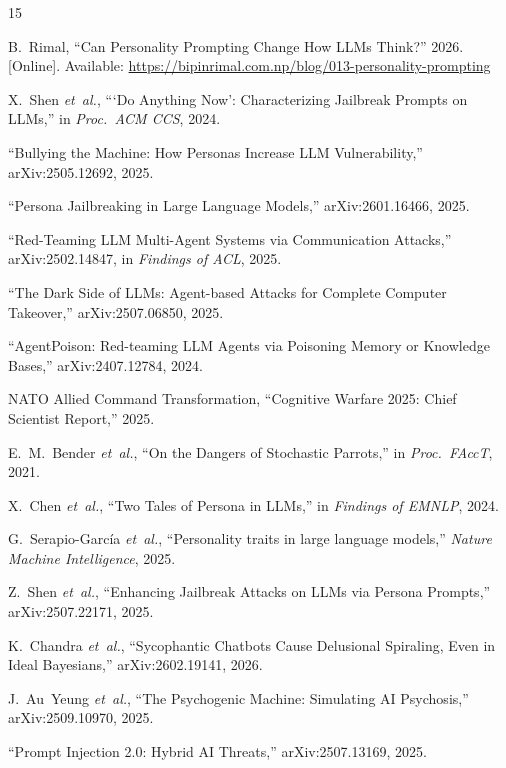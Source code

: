\documentclass[conference]{IEEEtran}
\begin{document}
\begin{thebibliography}{15}

B.~Rimal, ``Can Personality Prompting Change How LLMs Think?'' 2026. [Online]. Available: \url{https://bipinrimal.com.np/blog/013-personality-prompting}

X.~Shen \textit{et~al.}, ```Do Anything Now': Characterizing Jailbreak Prompts on LLMs,'' in \textit{Proc.\ ACM CCS}, 2024.

``Bullying the Machine: How Personas Increase LLM Vulnerability,'' arXiv:2505.12692, 2025.

``Persona Jailbreaking in Large Language Models,'' arXiv:2601.16466, 2025.

``Red-Teaming LLM Multi-Agent Systems via Communication Attacks,'' arXiv:2502.14847, in \textit{Findings of ACL}, 2025.

``The Dark Side of LLMs: Agent-based Attacks for Complete Computer Takeover,'' arXiv:2507.06850, 2025.

``AgentPoison: Red-teaming LLM Agents via Poisoning Memory or Knowledge Bases,'' arXiv:2407.12784, 2024.

NATO Allied Command Transformation, ``Cognitive Warfare 2025: Chief Scientist Report,'' 2025.

E.~M.~Bender \textit{et~al.}, ``On the Dangers of Stochastic Parrots,'' in \textit{Proc.\ FAccT}, 2021.

X.~Chen \textit{et~al.}, ``Two Tales of Persona in LLMs,'' in \textit{Findings of EMNLP}, 2024.

G.~Serapio-Garc\'{i}a \textit{et~al.}, ``Personality traits in large language models,'' \textit{Nature Machine Intelligence}, 2025.

Z.~Shen \textit{et~al.}, ``Enhancing Jailbreak Attacks on LLMs via Persona Prompts,'' arXiv:2507.22171, 2025.

K.~Chandra \textit{et~al.}, ``Sycophantic Chatbots Cause Delusional Spiraling, Even in Ideal Bayesians,'' arXiv:2602.19141, 2026.

J.~Au~Yeung \textit{et~al.}, ``The Psychogenic Machine: Simulating AI Psychosis,'' arXiv:2509.10970, 2025.

``Prompt Injection 2.0: Hybrid AI Threats,'' arXiv:2507.13169, 2025.

\end{thebibliography}
\end{document}
